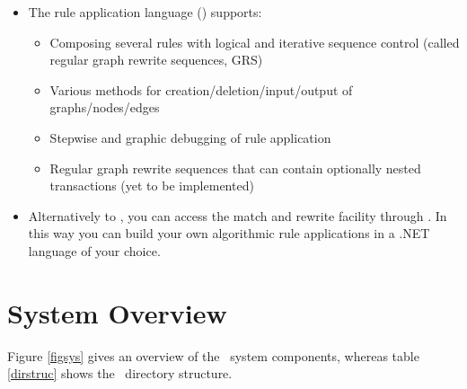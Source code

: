 \begin{itemize}
  \item The rule application language (\GrShell) supports:
  \begin{itemize}
    \item Composing several rules with logical and iterative sequence control (called regular graph rewrite sequences, GRS)
    \item Various methods for creation/deletion/input/output of graphs/nodes/edges 
    \item Stepwise and graphic debugging of rule application
    \item Regular graph rewrite sequences that can contain optionally nested transactions (yet to be implemented)
  \end{itemize}
  
  \item Alternatively to \GrShell, you can access the match and rewrite facility through \LibGr. In this way you can build your own algorithmic rule applications in a .NET language of your choice. 
\end{itemize}


\section{System Overview}

Figure \ref{figsys} gives an overview of the \GrG\ system components, whereas table \ref{dirstruc} shows the \GrG\ directory structure.

